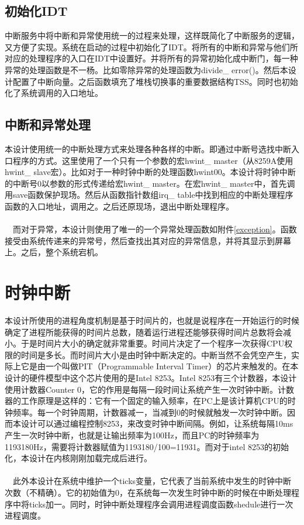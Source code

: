 \documentclass[UTF8,nofonts,cs4size]{ctexrep}
\begin{document}
\subsection{初始化IDT}
中断服务中将中断和异常使用统一的过程来处理，这样既简化了中断服务的逻辑，又方便了实现。系统在启动的过程中初始化了IDT。将所有的中断和异常与他们所对应的处理程序的入口在IDT中设置好。并将所有的异常初始化成中断门，每一种异常的处理函数是不一杨。比如零除异常的处理函数为divide\_ error()。然后本设计配置了中断向量。之后函数填充了堆栈切换事的重要数据结构TSS。同时也初始化了系统调用的入口地址。
\subsection{中断和异常处理}
本设计使用统一的中断处理方式来处理各种各样的中断。即通过中断号选找中断入口程序的方式。这里使用了一个只有一个参数的宏hwint\_ master（从8259A使用hwint\_ slave宏）。比如对于一种时钟中断的处理函数hwint00。本设计将时钟中断的中断号0以参数的形式传递给宏hwint\_ master。在宏hwint\_ master中，首先调用save函数保护现场。然后从函数指针数组irq\_ table中找到相应的中断处理程序函数的入口地址，调用之。之后还原现场，退出中断处理程序。
\paragraph{}
\indent \ \ 而对于异常，本设计则使用了唯一的一个异常处理函数如附件\ref{exception}。函数接受由系统传递来的异常号，然后查找出其对应的异常信息，并将其显示到屏幕上。之后，整个系统宕机。
\section{时钟中断}
本设计所使用的进程角度机制是基于时间片的，也就是说程序在一开始运行的时候确定了进程所能获得的时间片总数，随着运行进程还能够获得时间片总数将会减小。于是时间片大小的确定就非常重要。时间片决定了一个程序一次获得CPU权限的时间是多长。而时间片大小是由时钟中断决定的。中断当然不会凭空产生，实际上它是由一个叫做PIT（Programmable Interval Timer）的芯片来触发的。在本设计的硬件模型中这个芯片使用的是Intel 8253。Intel 8253有三个计数器，本设计使用计数器Counter 0，它的作用是每隔一段时间让系统产生一次时钟中断。计数器的工作原理是这样的：它有一个固定的输入频率，在PC上是该计算机CPU的时钟频率。每一个时钟周期，计数器减一，当减到0的时候就触发一次时钟中断。因而本设计可以通过编程控制8253，来改变时钟中断间隔。例如，让系统每隔10ms产生一次时钟中断，也就是让输出频率为100Hz，而且PC的时钟频率为1193180Hz，需要将计数器赋值为1193180/100=11931。而对于intel 8253的初始化，本设计在内核刚刚加载完成后进行。
\paragraph{}
\indent \ \ 
此外本设计在系统中维护一个ticks变量，它代表了当前系统中发生的时钟中断次数（不精确）。它的初始值为0，在系统每一次发生时钟中断的时候在中断处理程序中将ticks加一。同时，时钟中断处理程序会调用进程调度函数shedule进行一次进程调度。
\end{document}
